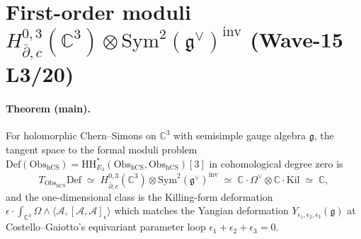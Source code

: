 
\providecommand{\Obs}{\mathrm{Obs}}
\providecommand{\hCS}{\mathrm{hCS}}
\providecommand{\Def}{\mathrm{Def}}
\providecommand{\HH}{\mathrm{HH}}
\providecommand{\CE}{\mathrm{CE}}
\providecommand{\Sym}{\mathrm{Sym}}
\providecommand{\Tr}{\mathrm{Tr}}
\providecommand{\Kil}{\mathrm{Kil}}
\providecommand{\inv}{\mathrm{inv}}
\providecommand{\g}{\mathfrak{g}}
\providecommand{\dbar}{\bar\partial}
\providecommand{\C}{\mathbb{C}}
\providecommand{\cO}{\mathcal{O}}
\providecommand{\cA}{\mathcal{A}}
\providecommand{\MC}{\mathrm{MC}}
\providecommand{\kch}{\kappa_{\mathrm{ch}}}
\providecommand{\id}{\mathrm{id}}

\section*{First-order moduli $H^{0,3}_{\dbar,c}(\C^3)\otimes\Sym^2(\g^\vee)^{\inv}$ (Wave-15 L3/20)}

\paragraph{Theorem (main).}
For holomorphic Chern--Simons on $\C^3$ with semisimple gauge algebra
$\g$, the tangent space to the formal moduli problem
$\Def(\Obs_{\hCS})=\HH^\ast_{E_3}(\Obs_{\hCS},\Obs_{\hCS})[3]$ in
cohomological degree zero is
\[
  T_{\Obs_{\hCS}}\Def
  \;\simeq\;
  H^{0,3}_{\dbar,c}(\C^3)\otimes\Sym^2(\g^\vee)^{\inv}
  \;\simeq\;
  \C\cdot\Omega^\vee\otimes\C\cdot\Kil
  \;\simeq\;
  \C,
\]
and the one-dimensional class is the Killing-form deformation
$\epsilon\cdot\int_{\C^3}\Omega\wedge\langle\cA,[\cA,\cA]_\epsilon\rangle$
which matches the Yangian deformation $Y_{\epsilon_1,\epsilon_2,
\epsilon_3}(\g)$ at Costello--Gaiotto's equivariant parameter loop
$\epsilon_1+\epsilon_2+\epsilon_3=0$.


